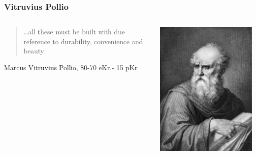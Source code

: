 \begin{frame}[fragile]
	\frametitle{Vitruvius Pollio}
	\begin{columns}[t]
		\begin{column}{7cm}
			\begin{center}
				\begin{quote}
					\ldots all these must be built with due reference to durability, convenience and beauty
				\end{quote}
			\end{center}
			\vskip 1cm
			Marcus Vitruvius Pollio, 80-70 eKr.- 15 pKr  \citep{pollio1914vitruvius}
		\end{column}
		\begin{column}[T]{3cm}
			\includegraphics[width=\textwidth]{vitruvio.jpg}
		\end{column}
	\end{columns}
\end{frame}
